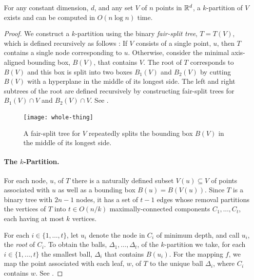 \documentclass{patmorin}
\begin{document}
\begin{lem}
  For any constant dimension, $d$, and any set $V$ of $n$ points in
  $\mathbb{R}^d$, a $k$-partition of $V$ exists and can be computed in $O(n\log
  n)$ time.
\end{lem}

\begin{proof}
  We construct a $k$-partition using the binary \emph{fair-split
  tree}, $T=T(V)$, which is defined recursively as follows
  \cite{callahan.kosaraju:decomposition}: If $V$ consists of a single
  point, $u$, then $T$ contains a single node corresponding to $u$.
  Otherwise, consider the minimal axis-aligned bounding box, $B(V)$,
  that contains $V$.  The root of $T$ corresponds to $B(V)$ and this
  box is split into two boxes $B_1(V)$ and $B_2(V)$ by cutting $B(V)$
  with a hyperplane in the middle of its longest side.  The left and
  right subtrees of the root are defined recursively by constructing
  fair-split trees for $B_1(V)\cap V$ and $B_2(V)\cap V$. See .

  \begin{figure}
    \begin{center}
      \texttt{[image: whole-thing]}
    \end{center}
    \caption{A fair-split tree for $V$ repeatedly splits the bounding
      box $B(V)$ in the middle of its longest side.}
  \end{figure}

  \paragraph{The $k$-Partition.}
  For each node, $u$, of $T$ there is a naturally defined subset
  $V(u)\subseteq V$ of points associated with $u$ as well as a bounding
  box $B(u)=B(V(u))$.  Since $T$ is a binary tree with $2n-1$ nodes, it
  has a set of $t-1$ edges whose removal partitions the vertices of $T$
  into $t\in O(n/k)$ maximally-connected components $C_1,\ldots,C_t$,
  each having at most $k$ vertices.

  For each $i\in\{1,\ldots,t\}$, let $u_i$ denote the node in $C_i$ of
  minimum depth, and call $u_i$, the \emph{root} of $C_i$.
  To obtain the balls, $\Delta_1,\ldots,\Delta_t$, of the $k$-partition we
  take, for each $i\in\{1,\ldots,t\}$ the smallest ball, $\Delta_i$ that
  contains $B(u_i)$.  For the mapping $f$, we map the point associated
  with each leaf, $w$, of $T$ to the unique ball $\Delta_i$, where $C_i$
  contains $w$. See .


\end{proof}
\end{document}
